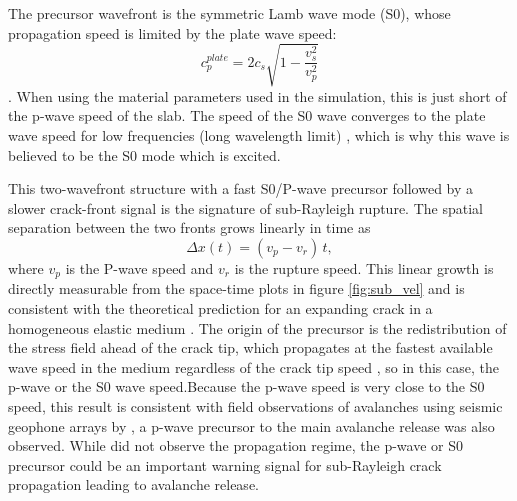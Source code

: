 The precursor wavefront is the symmetric Lamb wave mode (S0), whose propagation speed is limited by the plate wave speed: \begin{equation}
  c_p^{plate} = 2c_s\sqrt{1-\frac{v_s^2}{v_p^2}}
\end{equation} \parencite{roseWavesPlates2014}. When using the material parameters used in the simulation, this is just short of the p-wave speed of the slab. The speed of the S0 wave converges to the plate wave speed for low frequencies (long wavelength limit) \parencite{roseWavesPlates2014}, which is why this wave is believed to be the S0 mode which is excited. \par

This two-wavefront structure with a fast S0/P-wave precursor followed by a slower crack-front signal is the signature of sub-Rayleigh rupture. The
spatial separation between the two fronts grows linearly in time as
\begin{equation}
  \Delta x(t) = (v_p - v_r)\,t,
  \label{eq:front_separation}
\end{equation} where \(v_p\) is the P-wave speed and \(v_r\) is the rupture speed. This linear growth is directly measurable from the space-time plots in figure \ref{fig:sub_vel} and is consistent with the theoretical prediction for an expanding crack in a homogeneous elastic medium \parencite{freundDynamicFractureMechanics1998}. The origin of the precursor is the redistribution of the stress field ahead of the crack tip, which propagates at the fastest available wave
speed in the medium regardless of the crack tip speed
\parencite{kAkiRichards19801981}, so in this case, the p-wave or the S0 wave speed.Because the p-wave speed is very close to the S0 speed, this result is consistent with field observations of avalanches using seismic geophone arrays by \cite{herwijnenSeismicSensorArray2011}, a p-wave precursor to the main avalanche release was also observed. While \cite{herwijnenSeismicSensorArray2011} did not observe the propagation regime,  the p-wave or S0 precursor could be an important warning signal for sub-Rayleigh crack propagation leading to avalanche release. \par

